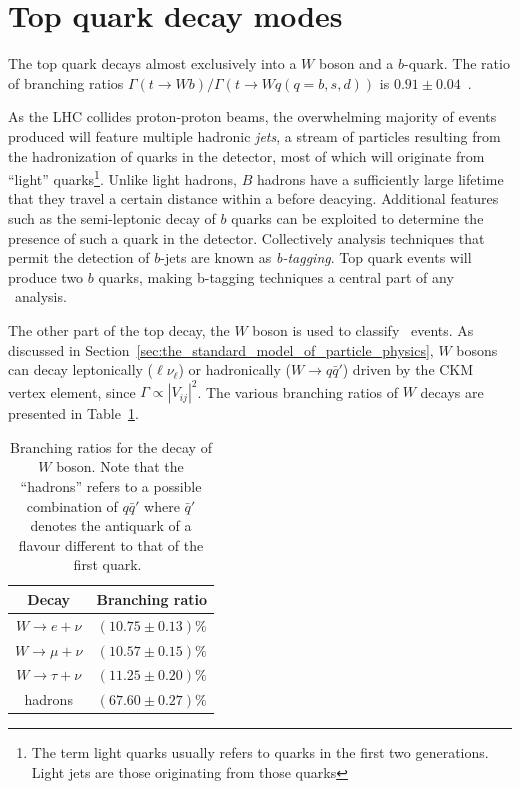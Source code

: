 \section{Top quark decay modes} \label{sec:top_quark_decay_modes}

The top quark decays almost exclusively into a $W$ boson and a $b$-quark. The ratio of branching ratios $\Gamma(t\rightarrow Wb)/\Gamma(t\rightarrow Wq(q=b,s,d))$ is $0.91\pm0.04$~\cite{Theory:PDGBooklet}.

As the LHC collides proton-proton beams, the overwhelming majority of events produced will feature multiple hadronic \textit{jets}, a stream of particles resulting from the hadronization of quarks in the detector, most of which will originate from ``light'' quarks\footnote{The term light quarks usually refers to quarks in the first two generations. Light jets are those originating from those quarks}. Unlike light hadrons, $B$ hadrons have a sufficiently large lifetime that they travel a certain distance within a before deacying. Additional features such as the semi-leptonic decay of $b$ quarks can be exploited to determine the presence of such a quark in the detector. Collectively analysis techniques that permit the detection of $b$-jets are known as \textit{b-tagging}. Top quark events will produce two $b$ quarks, making b-tagging techniques a central part of any \ttbar\ analysis.

The other part of the top decay, the $W$ boson is used to classify \ttbar\ events. As discussed in Section~\ref{sec:the_standard_model_of_particle_physics}, $W$ bosons can decay leptonically ($\ell\nu_{\ell}$) or hadronically ($W\rightarrow q\bar{q}'$) driven by the CKM vertex element, since $\Gamma\propto|V_{ij}|^2$. The various branching ratios of $W$ decays are presented in Table~\ref{tab:TopQuakWDecayBranchingRatios}.

\begin{table}
  \centering
  \begin{tabular}{|c|c|}
    \hline
    Decay                   & Branching ratio \\ \hline\hline
    $W\rightarrow e+\nu$    & $(10.75\pm0.13)\%$ \\
    $W\rightarrow \mu+\nu$  & $(10.57\pm0.15)\%$ \\
    $W\rightarrow \tau+\nu$ & $(11.25\pm0.20)\%$ \\
    hadrons                 & $(67.60\pm0.27)\%$ \\
    \hline
  \end{tabular}
  \caption{Branching ratios for the decay of $W$ boson. Note that the ``hadrons'' refers to a possible combination of $q\bar{q}'$ where $\bar{q}'$ denotes the antiquark of a flavour different to that of the first quark.~\cite{Theory:PDGBooklet}}
  \label{tab:TopQuakWDecayBranchingRatios}
\end{table}

